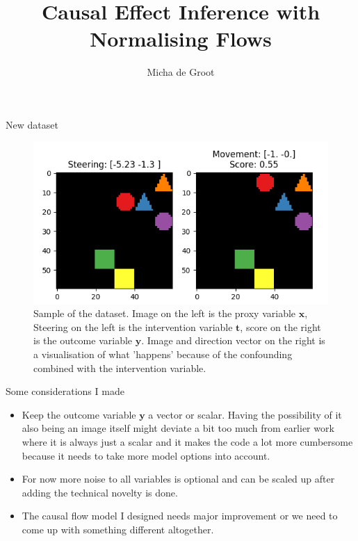 \documentclass{beamer}
\title{Causal Effect Inference with Normalising Flows}
\author{Micha de Groot}
\newcommand{\bt}{\mathbf{t}}
\newcommand{\bx}{\mathbf{x}}
\newcommand{\by}{\mathbf{y}}
\begin{document}
	
	\begin{frame}
		\titlepage
	\end{frame}
	
	
	\begin{frame}{New dataset} 
		\begin{figure}
            \centering
            \includegraphics[scale=0.7]{latex/Figures/sample_space_shapes_with_score.png}
            \caption{Sample of the dataset. Image on the left is the proxy variable $\bx$, Steering on the left is the intervention variable $\bt$, score on the right is the outcome variable $\by$. Image and direction vector on the right is a visualisation of what 'happens' because of the confounding combined with the intervention variable.}
            \label{fig:graph_observed_confounder_and_latent_with_proxy}
        \end{figure}
	\end{frame}
	
	\begin{frame}{Some considerations I made}
		\begin{itemize}
		    \item Keep the outcome variable $\by$ a vector or scalar. Having the possibility of it also being an image itself might deviate a bit too much from earlier work where it is always just a scalar and it makes the code a lot more cumbersome because it needs to take more model options into account.
		    \item For now more noise to all variables is optional and can be scaled up after adding the technical novelty is done.
		    \item The causal flow model I designed needs major improvement or we need to come up with something different altogether. 
		\end{itemize}
	\end{frame}
	
\end{document}
